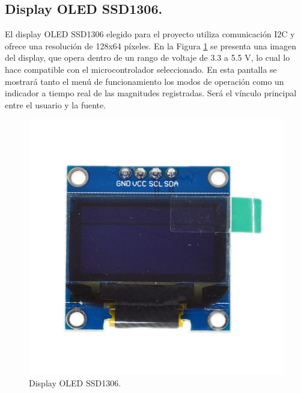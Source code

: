 \subsection{Display OLED SSD1306.}
El display OLED SSD1306 elegido para el proyecto utiliza comunicación I2C y ofrece una resolución de 128x64 píxeles. En la Figura \ref{F:display} se presenta una imagen del display, que opera dentro de un rango de voltaje de 3.3 a 5.5 V, lo cual lo hace compatible con el microcontrolador seleccionado. En esta pantalla se mostrará tanto el menú de funcionamiento los modos de operación como un indicador a tiempo real de las magnitudes registradas. Será el vínculo principal entre el usuario y la fuente.

\begin{figure}[H]
    \centering 
    \includegraphics[scale=0.3]{./imagenes/display.jpg}
    \caption{Display OLED SSD1306.}
    \label{F:display}
\end{figure}

